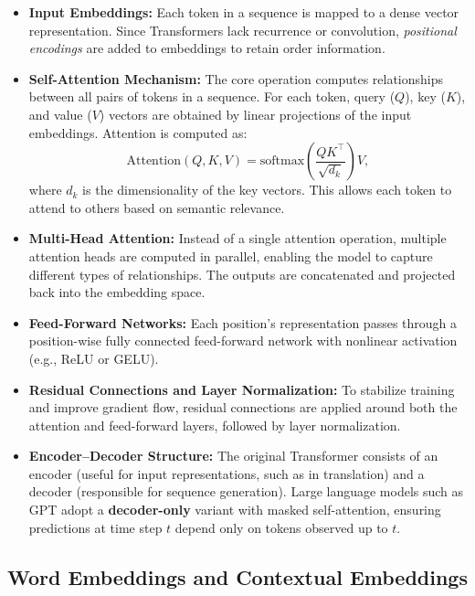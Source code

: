 \documentclass[12pt,a4paper]{report}
\begin{document}
\begin{itemize}
    \item \textbf{Input Embeddings:} Each token in a sequence is mapped to a dense vector representation. Since Transformers lack recurrence or convolution, \textit{positional encodings} are added to embeddings to retain order information.
    
    \item \textbf{Self-Attention Mechanism:} The core operation computes relationships between all pairs of tokens in a sequence. For each token, query ($Q$), key ($K$), and value ($V$) vectors are obtained by linear projections of the input embeddings. Attention is computed as:
    \[
    \text{Attention}(Q,K,V) = \text{softmax}\left(\frac{QK^\top}{\sqrt{d_k}}\right)V,
    \]
    where $d_k$ is the dimensionality of the key vectors. This allows each token to attend to others based on semantic relevance.
    
    \item \textbf{Multi-Head Attention:} Instead of a single attention operation, multiple attention heads are computed in parallel, enabling the model to capture different types of relationships. The outputs are concatenated and projected back into the embedding space.
    
    \item \textbf{Feed-Forward Networks:} Each position’s representation passes through a position-wise fully connected feed-forward network with nonlinear activation (e.g., ReLU or GELU).
    
    \item \textbf{Residual Connections and Layer Normalization:} To stabilize training and improve gradient flow, residual connections are applied around both the attention and feed-forward layers, followed by layer normalization.
    
    \item \textbf{Encoder–Decoder Structure:} The original Transformer consists of an encoder (useful for input representations, such as in translation) and a decoder (responsible for sequence generation). Large language models such as GPT adopt a \textbf{decoder-only} variant with masked self-attention, ensuring predictions at time step $t$ depend only on tokens observed up to $t$.
\end{itemize}

\subsection{Word Embeddings and Contextual Embeddings}
\end{document}
